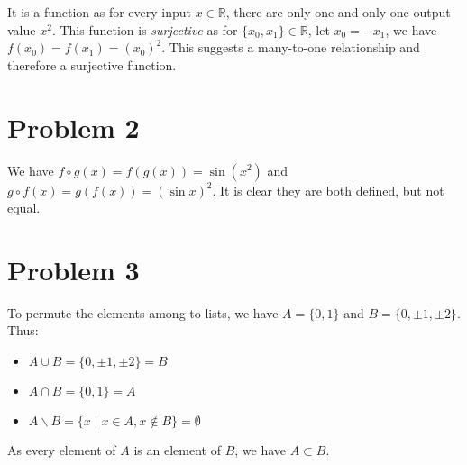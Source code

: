 \documentclass[11pt]{article}
\begin{document}
It is a function as for every input $x \in \mathbb{R}$, there are only one and only one output value $x^2$. This function is \textit{surjective} as for $\{x_0, x_1\} \in \mathbb{R}$, let $x_0 = -x_1$, we have $f(x_0) = f(x_1) = (x_0)^2$. This suggests a many-to-one relationship and therefore a surjective function.

\section*{Problem 2}

We have $f \circ g(x) = f(g(x)) = \sin(x^2)$ and  $g \circ f(x) = g(f(x)) = (\sin x)^2$. It is clear they are both defined, but not equal.

\section*{Problem 3}

To permute the elements among to lists, we have $A = \{0, 1\}$ and $B = \{0, \pm1, \pm2\}$. Thus:

\begin{itemize}
    \item $A \cup B = \{0, \pm1, \pm2\} = B$
    \item $A \cap B = \{0, 1\} = A$
    \item $A \backslash B = \{x \mid x \in A, x \not\in B\} = \emptyset$
\end{itemize}

\noindent As every element of $A$ is an element of $B$, we have $A \subset B$.
\end{document}
